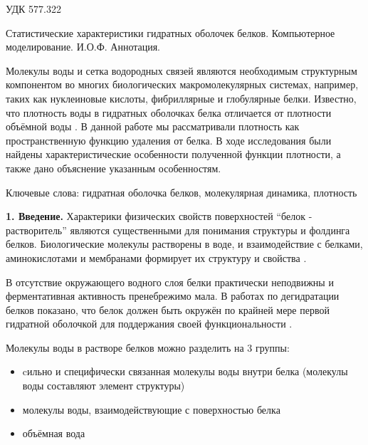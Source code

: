\documentclass[a4paper]{article}
\begin{document}


\begin{flushleft}
УДК 577.322
\end{flushleft}

\begin{center}
Статистические характеристики гидратных оболочек белков. Компьютерное моделирование.
\newline
И.О.Ф.
\newline
\newline
Аннотация.
\end{center}

Молекулы воды и сетка водородных связей являются необходимым структурным компонентом во многих биологических макромолекулярных системах, например, таких как нуклеиновые кислоты, фибриллярные и глобулярные белки. Известно, что плотность воды в гидратных оболочках белка отличается от плотности объёмной воды \cite{Svergun} . В данной работе мы рассматривали плотность как пространственную функцию удаления от белка. В ходе исследования были найдены характеристические особенности полученной функции плотности, а также дано объяснение указанным особенностям.
  
Ключевые слова: гидратная оболочка белков, молекулярная динамика, плотность 

\textbf{1. Введение.} Характерики физических свойств поверхностей “белок - растворитель” являются существенными для понимания структуры и фолдинга белков. Биологические молекулы растворены в воде, и взаимодействие с белками, аминокислотами и мембранами формирует их структуру и свойства \cite{Kauzman}.

В отсутствие окружающего водного слоя белки практически неподвижны и ферментативная активность пренебрежимо мала. В работах по дегидратации белков показано, что белок должен быть окружён по крайней мере первой гидратной оболочкой для поддержания своей функциональности \cite{Mattos}.

Молекулы воды в растворе белков можно разделить на 3 группы: 
\begin{itemize}
\item cильно и специфически связанная молекулы воды внутри белка (молекулы воды составляют элемент структуры)
\item молекулы воды, взаимодействующие с поверхностью белка
\item объёмная вода
\end{itemize}
\end{document}
